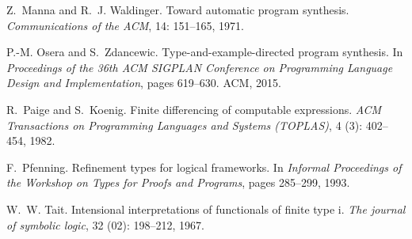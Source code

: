 \documentclass[preprint, 11pt]{sigplanconf}
\begin{document}
\begin{thebibliography}{14}
Z.~Manna and R.~J. Waldinger.
\newblock Toward automatic program synthesis.
\newblock \emph{Communications of the ACM}, 14: 151--165, 1971.

P.-M. Osera and S.~Zdancewic.
\newblock Type-and-example-directed program synthesis.
\newblock In \emph{Proceedings of the 36th ACM SIGPLAN Conference on
  Programming Language Design and Implementation}, pages 619--630. ACM, 2015.

R.~Paige and S.~Koenig.
\newblock Finite differencing of computable expressions.
\newblock \emph{ACM Transactions on Programming Languages and Systems
  (TOPLAS)}, 4 (3): 402--454, 1982.

F.~Pfenning.
\newblock Refinement types for logical frameworks.
\newblock In \emph{Informal Proceedings of the Workshop on Types for Proofs and
  Programs}, pages 285--299, 1993.

W.~W. Tait.
\newblock Intensional interpretations of functionals of finite type i.
\newblock \emph{The journal of symbolic logic}, 32 (02):
  198--212, 1967.

\end{thebibliography}


\end{document}
